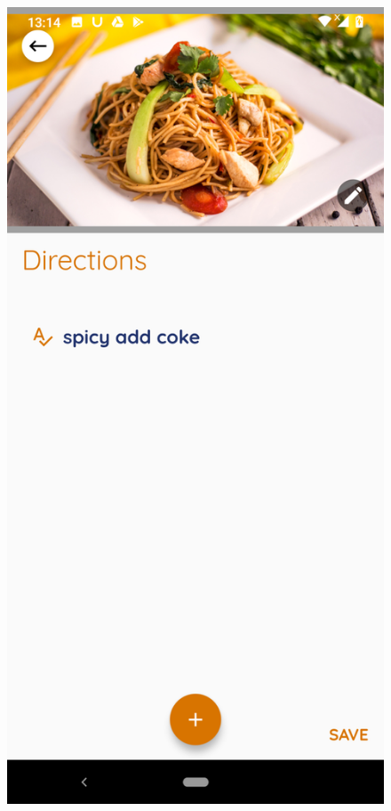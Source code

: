 \documentclass{article}
\begin{document}
\begin{figure}[h!]
        \includegraphics[scale=0.1]{Images/frienod_dire.jpg}

\end{figure}
\end{document}
